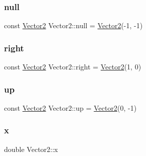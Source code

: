 \mbox{\label{struct_vector2_a2c6e0149051082f87c4f63f97e07c7ae}} 
\subsubsection{\texorpdfstring{null}{null}}
{\footnotesize\ttfamily const \mbox{\hyperlink{struct_vector2}{Vector2}} Vector2\+::null = \mbox{\hyperlink{struct_vector2}{Vector2}}(-\/1, -\/1)\hspace{0.3cm}{\ttfamily [static]}}

\mbox{\label{struct_vector2_aa9712253176cedb918592990df5ea611}} 
\subsubsection{\texorpdfstring{right}{right}}
{\footnotesize\ttfamily const \mbox{\hyperlink{struct_vector2}{Vector2}} Vector2\+::right = \mbox{\hyperlink{struct_vector2}{Vector2}}(1, 0)\hspace{0.3cm}{\ttfamily [static]}}

\mbox{\label{struct_vector2_a0de964f9acb5cc8669d0b3b9f5b9d4eb}} 
\subsubsection{\texorpdfstring{up}{up}}
{\footnotesize\ttfamily const \mbox{\hyperlink{struct_vector2}{Vector2}} Vector2\+::up = \mbox{\hyperlink{struct_vector2}{Vector2}}(0, -\/1)\hspace{0.3cm}{\ttfamily [static]}}

\mbox{\label{struct_vector2_a61d73d9036ccbb3257fbe595c014a1d0}} 
\subsubsection{\texorpdfstring{x}{x}}
{\footnotesize\ttfamily double Vector2\+::x}

\mbox{\label{struct_vector2_a4df9b2a8e79e6e30a7a3b34722d8b8b8}} 
